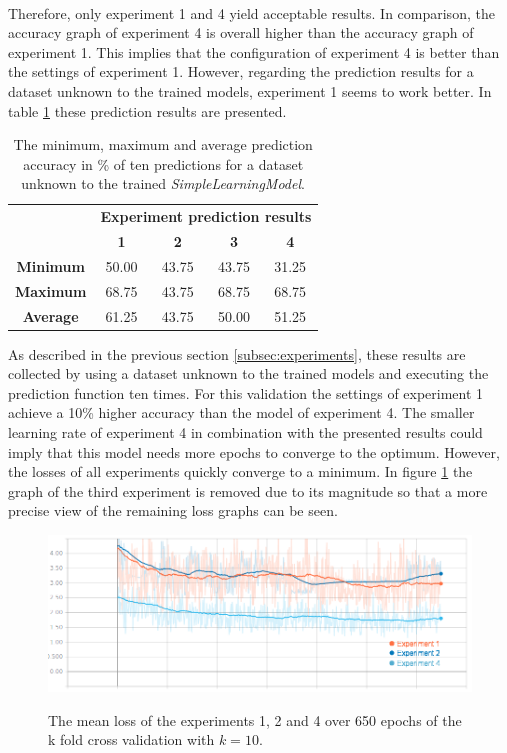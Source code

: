 \\ Therefore, only experiment 1 and 4 yield acceptable results. In comparison, the accuracy graph of experiment 4 is overall higher than the accuracy graph of experiment 1. This implies that the configuration of experiment 4 is better than the settings of experiment 1. However, regarding the prediction results for a dataset unknown to the trained models, experiment 1 seems to work better. In table \ref{tbl:slmpredictresults} these prediction results are presented. 
\begin{table}[!ht]
	\begin{center}
		\begin{tabular}{c|c|c|c|c|}
			\multirow{2}{1cm}{} & \multicolumn{4}{c|}{\textbf{Experiment prediction results}} \\
			& \textbf{1} & \textbf{2} & \textbf{3} & \textbf{4}\\
			\hline
			\textbf{Minimum} & 50.00 & 43.75 & 43.75 & 31.25 \\
			\hline
			\textbf{Maximum} & 68.75 & 43.75 & 68.75 & 68.75 \\
			\hline
			\textbf{Average} & 61.25 & 43.75 & 50.00 & 51.25 \\
		\end{tabular}
	\end{center}
	\caption{The minimum, maximum and average prediction accuracy in \% of ten predictions for a dataset unknown to the trained \textit{SimpleLearningModel}. }
	\label{tbl:slmpredictresults}
\end{table}
As described in the previous section \ref{subsec:experiments}, these results are collected by using a dataset unknown to the trained models and executing the prediction function ten times. For this validation the settings of experiment 1 achieve a 10\% higher accuracy than the model of experiment 4. The smaller learning rate of experiment 4 in combination with the presented results could imply that this model needs more epochs to converge to the optimum. However, the losses of all experiments quickly converge to a minimum. In figure \ref{fig:loss650epochs2} the graph of the third experiment is removed due to its magnitude so that a more precise view of the remaining loss graphs can be seen. 
\begin{figure}[!ht]
	\caption{The mean loss of the experiments 1, 2 and 4 over 650 epochs of the k fold cross validation with $k=10$. }
	\includegraphics[width=0.95\linewidth]{images/evaluation/slm-k-losses-2.png}
	\label{fig:loss650epochs2}
\end{figure}

